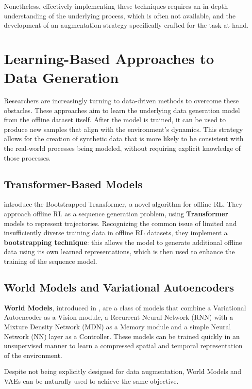 Nonetheless, effectively implementing these techniques
requires an in-depth understanding
of the underlying process, which is often not available, and
the development of an augmentation strategy specifically
crafted for the task at hand.

\section{Learning-Based Approaches to Data Generation}

Researchers are increasingly turning to data-driven methods
to overcome these obstacles. These approaches aim to learn
the underlying data generation model from the offline
dataset itself. After the model is trained,
it can be used to produce new samples that align
with the environment's dynamics. This strategy allows
for the creation of synthetic data that is more likely
to be consistent with the real-world processes
being modeled, without requiring explicit knowledge
of those processes.

\subsection{Transformer-Based Models}

\cite{wang2022} introduce the Bootstrapped Transformer,
a novel algorithm for offline RL.
They approach offline RL as a sequence generation
problem, using \textbf{Transformer} models to represent
trajectories. Recognizing the common issue of
limited and insufficiently diverse training
data in offline RL datasets, they implement a
\textbf{bootstrapping technique}: 
this allows the model to generate additional
offline data using its own learned representations,
which is then used to enhance the training of
the sequence model.

\subsection{World Models and Variational Autoencoders}

\textbf{World Models}, introduced in \cite{ha2018},
are a class of models that combine a Variational
Autoencoder as a Vision module,
a Recurrent Neural Network (RNN)
with a Mixture Density Network (MDN) as a Memory
module and a simple Neural Network (NN)
layer as a Controller.
These models can be trained
quickly in an unsupervised manner to learn a
compressed spatial and temporal representation
of the environment.

Despite not being explicitly designed for data augmentation,
World Models and VAEs
can be naturally used to achieve the same objective.

